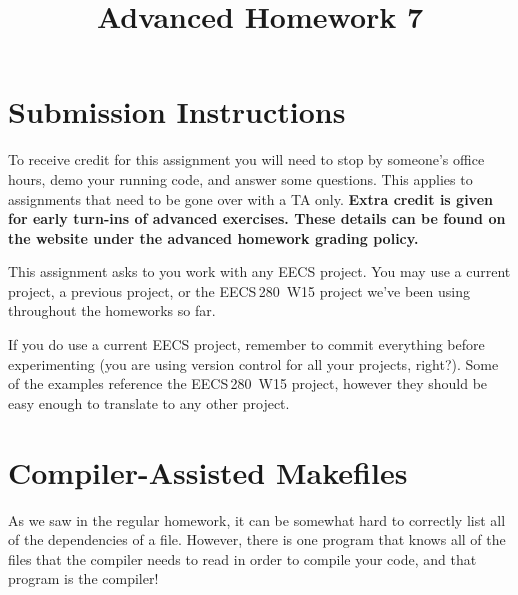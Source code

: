 \documentclass{article}
\begin{document}
\fancyfoot[C]{\color{gray} \thepage~/~\pageref*{LastPage}}
\pagestyle{fancyplain}

\title{\textbf{Advanced Homework 7\\}}
\author{\textbf{\color{red}{Due: Wednesday, October 31st, 11:59PM (Hard Deadline)}}}
\date{}
\maketitle


\section*{Submission Instructions}
To receive credit for this assignment you will need to stop by someone's
office hours, demo your running code, and answer some questions. \textbf{\color{red}{Make sure
to check the office hour schedule as the real due date is at the last office
hours before the date listed above.}} This applies to assignments that need to be gone over with a TA only.
\textbf{Extra credit is given for early turn-ins of advanced exercises. These details can be found on the website under the advanced homework grading policy.}


\begin{mdframed}[innerleftmargin=38pt,innerrightmargin=38pt]\justify
  This assignment asks to you work with any EECS project. You may use a
  current project, a previous project, or the EECS\,280~W15 project we've been
  using throughout the homeworks so far.

  If you do use a current EECS project, remember to commit everything before
  experimenting (you are using version control for all your projects, right?).
  Some of the examples reference the EECS\,280~W15 project, however they should
  be easy enough to translate to any other project.
\end{mdframed}

\section{Compiler-Assisted Makefiles}

As we saw in the regular homework, it can be somewhat hard to correctly list
all of the dependencies of a file. However, there is one program that knows
all of the files that the compiler needs to read in order to compile your
code, and that program is the compiler!
\end{document}
